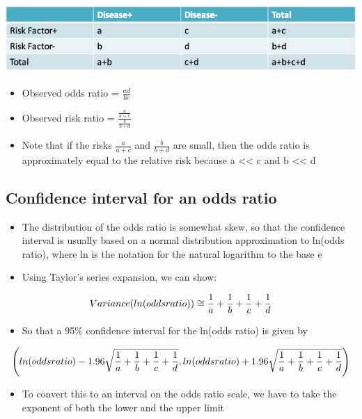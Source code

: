 \documentclass[
]{book}
\providecommand{\tightlist}{%
  \setlength{\itemsep}{0pt}\setlength{\parskip}{0pt}}
\begin{document}
\includegraphics[width=1\linewidth]{./8_5}

\begin{itemize}
\tightlist
\item
  Observed odds ratio = \(\frac{ad}{bc}\)
\item
  Observed risk ratio = \(\frac{\frac{a}{a+c}}{\frac{b}{b+d}}\)
\item
  Note that if the risks \(\frac{a}{a+c}\) and \(\frac{b}{b+d}\) are small, then the odds ratio is approximately equal to the relative risk because a \textless\textless{} c and b \textless\textless{} d
\end{itemize}

\hypertarget{confidence-interval-for-an-odds-ratio}{%
\subsection{Confidence interval for an odds ratio}\label{confidence-interval-for-an-odds-ratio}}

\begin{itemize}
\tightlist
\item
  The distribution of the odds ratio is somewhat skew, so that the confidence interval is usually based on a normal distribution approximation to ln(odds ratio), where ln is the notation for the natural logarithm to the base e
\item
  Using Taylor's series expansion, we can show:
\end{itemize}

\[Variance(ln(odds\space ratio)) \cong \frac{1}{a}+\frac{1}{b}+\frac{1}{c}+\frac{1}{d}\]

\begin{itemize}
\tightlist
\item
  So that a 95\% confidence interval for the ln(odds ratio) is given by
\end{itemize}

\[\left(ln(odds\space ratio)-1.96\sqrt{\frac{1}{a}+\frac{1}{b}+\frac{1}{c}+\frac{1}{d}},ln(odds\space ratio)+1.96\sqrt{\frac{1}{a}+\frac{1}{b}+\frac{1}{c}+\frac{1}{d}}\right)\]

\begin{itemize}
\tightlist
\item
  To convert this to an interval on the odds ratio scale, we have to take the exponent of both the lower and the upper limit
\end{itemize}
\end{document}
